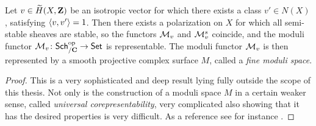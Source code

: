 \begin{theorem}
    \label{Representability of moduli functor}
    Let $v \in \widetilde{H}(X, \mathbf Z)$ be an isotropic vector for which there exists a class $v' \in N(X)$, satisfying $\langle v, v' \rangle = 1$. Then there exists a polarization on $X$ for which all semi-stable sheaves are stable, so the functors $\mathcal M_v$ and $\mathcal M^s_v$ coincide, and the moduli functor $\mathcal M_v \colon \mathsf{Sch}_{/\mathbf C}^{\text{op}} \to \mathsf{Set}$ is representable. The moduli functor $\mathcal M_v$ is then represented by a smooth projective complex surface $M$, called a \emph{fine moduli space}.
\end{theorem}

\begin{proof}
    This is a very sophisticated and deep result lying fully outside the scope of this thesis. Not only is the construction of a moduli space $M$ in a certain weaker sense, called \emph{universal corepresentability}, very complicated also showing that it has the desired properties is very difficult. As a reference see for instance \cite[Theorem 3.6]{BayerMacri2014}.
\end{proof}


